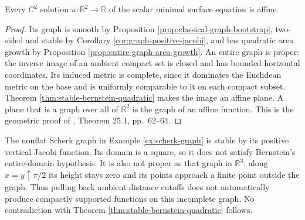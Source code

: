 \begin{theorem}\label{thm:bernstein-plane-graph}
Every $C^2$ solution $u:\mathbb R^2\to\mathbb R$ of the scalar minimal surface equation is affine.
\end{theorem}
\begin{proof}
Its graph is smooth by Proposition \ref{prop:classical-graph-bootstrap}, two-sided and stable by Corollary \ref{cor:graph-positive-jacobi}, and has quadratic area growth by Proposition \ref{prop:entire-graph-area-growth}. An entire graph is proper: the inverse image of an ambient compact set is closed and has bounded horizontal coordinates. Its induced metric is complete, since it dominates the Euclidean metric on the base and is uniformly comparable to it on each compact subset. Theorem \ref{thm:stable-bernstein-quadratic} makes the image an affine plane. A plane that is a graph over all of $\mathbb R^2$ is the graph of an affine function. This is the geometric proof of \cite{ChMin}, Theorem 25.1, pp.~62--64.
\end{proof}

\begin{example}\label{ex:scherk-bernstein-scope}
The nonflat Scherk graph in Example \ref{ex:scherk-graph} is stable by its positive vertical Jacobi function. Its domain is a square, so it does not satisfy Bernstein's entire-domain hypothesis. It is also not proper as that graph in $\mathbb R^3$: along $x=y\uparrow\pi/2$ its height stays zero and its points approach a finite point outside the graph. Thus pulling back ambient distance cutoffs does not automatically produce compactly supported functions on this incomplete graph. No contradiction with Theorem \ref{thm:stable-bernstein-quadratic} follows.
\end{example}
